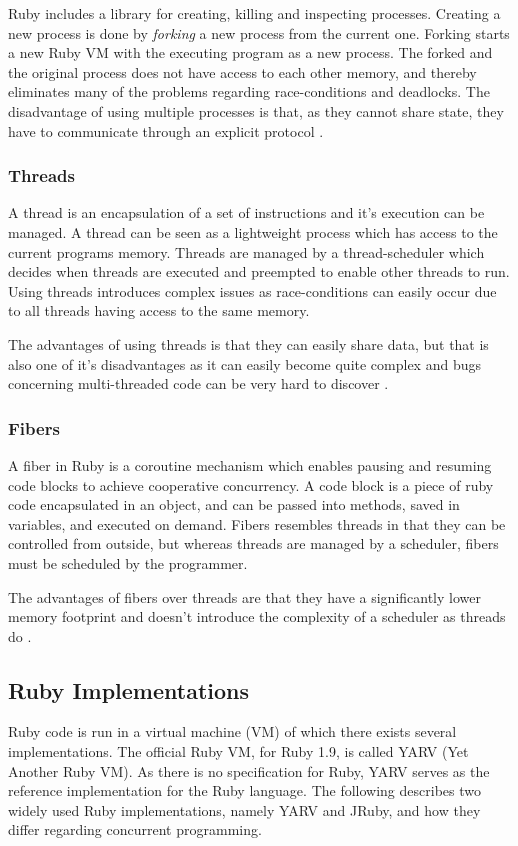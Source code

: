 Ruby includes a library for creating, killing and inspecting processes.
Creating a new process is done by \textit{forking} a new process from the
current one. Forking starts a new Ruby VM with the executing program as a new
process. The forked and the original process does not have access to each
other memory, and thereby eliminates many of the problems regarding
race-conditions and deadlocks. The disadvantage of using multiple processes is
that, as they cannot share state, they have to communicate through an explicit
protocol \cite{ruby19}.

\subsubsection{Threads}
A thread is an encapsulation of a set of instructions and it's execution can
be managed. A thread can be seen as a lightweight process which has access to
the current programs memory. Threads are managed by a thread-scheduler which
decides when threads are executed and preempted to enable other threads to
run. Using threads introduces complex issues as race-conditions can easily
occur due to all threads having access to the same memory.

The advantages of using threads is that they can easily share data, but that
is also one of it's disadvantages as it can easily become quite complex and
bugs concerning multi-threaded code can be very hard to discover \cite{ruby19}.

\subsubsection{Fibers}
A fiber in Ruby is a coroutine mechanism which enables pausing and resuming
code blocks to achieve cooperative concurrency. A code block is a
piece of ruby code encapsulated in an object, and can be passed into
methods, saved in variables, and executed on demand. Fibers resembles threads in
that they can be controlled from outside, but whereas threads are managed by a
scheduler, fibers must be scheduled by the programmer.

The advantages of fibers over threads are that they have a significantly lower
memory footprint and doesn't introduce the complexity of a scheduler as
threads do \cite{rubyfiber}.

\subsection{Ruby Implementations}
Ruby code is run in a virtual machine (VM) of which there exists several
implementations. The official Ruby VM, for Ruby 1.9, is called YARV (Yet
Another Ruby VM). As there is no specification for Ruby, YARV serves as
the reference implementation for the Ruby language. The following describes
two widely used Ruby implementations, namely YARV and JRuby, and how they
differ regarding concurrent programming.

